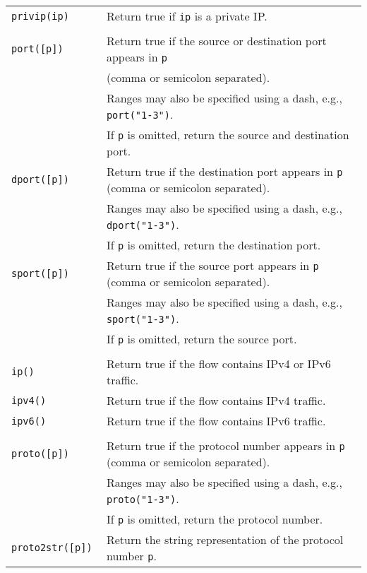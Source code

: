 \documentclass[documentation]{subfiles}
\begin{document}
\begin{longtable}{>{\tt}ll}
    privip(ip)                  & Return true if {\tt ip} is a private IP.\\
    \\
    port([p])                   & Return true if the source or destination port appears in {\tt p}\\
                                & (comma or semicolon separated).\\
                                & Ranges may also be specified using a dash, e.g., {\tt port("1-3")}.\\
                                & If {\tt p} is omitted, return the source and destination port.\\
    dport([p])                  & Return true if the destination port appears in {\tt p} (comma or semicolon separated).\\
                                & Ranges may also be specified using a dash, e.g., {\tt dport("1-3")}.\\
                                & If {\tt p} is omitted, return the destination port.\\
    sport([p])                  & Return true if the source port appears in {\tt p} (comma or semicolon separated).\\
                                & Ranges may also be specified using a dash, e.g., {\tt sport("1-3")}.\\
                                & If {\tt p} is omitted, return the source port.\\
    \\
    ip()                        & Return true if the flow contains IPv4 or IPv6 traffic.\\
    ipv4()                      & Return true if the flow contains IPv4 traffic.\\
    ipv6()                      & Return true if the flow contains IPv6 traffic.\\
    \\
    proto([p])                  & Return true if the protocol number appears in {\tt p} (comma or semicolon separated).\\
                                & Ranges may also be specified using a dash, e.g., {\tt proto("1-3")}.\\
                                & If {\tt p} is omitted, return the protocol number.\\
    proto2str([p])              & Return the string representation of the protocol number {\tt p}.\\

\end{longtable}
\end{document}
